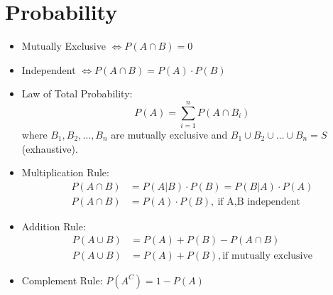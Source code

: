 \documentclass[%
 aip,
 jmp,%
 amsmath,amssymb,
 reprint,%
]{revtex4-1}
\begin{document}
\section{Probability}
\begin{itemize}[label={}]
\item Mutually Exclusive $\Leftrightarrow P(A \cap B) = 0$
\item Independent $\Leftrightarrow P(A \cap B) = P(A)\cdot P(B)$
\item Law of Total Probability: $$ P(A) = \sum_{i=1}^{n} P(A \cap B_i)$$
where $B_1,B_2,\dots, B_n$ are mutually exclusive and $B_1 \cup B_2 \cup \dots \cup B_n = S$ (exhaustive).
\item Multiplication Rule: 
\begin{equation*}
\begin{aligned}
P(A \cap B) &= P(A|B) \cdot P(B) = P(B|A) \cdot P(A)\\
P(A \cap B) &= P(A) \cdot P(B),\ \textrm{if A,B independent}
\end{aligned}
\end{equation*}
\item Addition Rule: 
\begin{equation*}
\begin{aligned}
P(A \cup B) &= P(A) + P(B) - P(A \cap B) \\
P(A \cup B) &= P(A) + P(B), \textrm{if mutually exclusive}
\end{aligned}
\end{equation*}
\item Complement Rule: $P(A^C) = 1 - P(A)$
\end{itemize}
\end{document}
